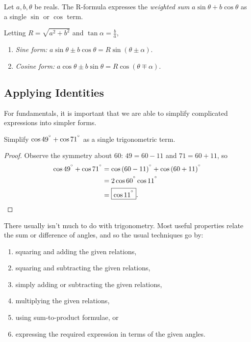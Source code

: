 \documentclass[../main.tex]{subfiles}
\begin{document}
\begin{proposition}
    Let $a,b,\theta$ be reals. The R-formula expresses the \textit{weighted sum} $a\sin\theta+b\cos\theta$ as a single $\sin$ or $\cos$ term.

    Letting $R=\sqrt{a^2+b^2}$ and $\tan\alpha=\frac{b}{a}$,
    \begin{enumerate}
        \item \textit{Sine form:} $a\sin\theta\pm b\cos\theta=R\sin(\theta\pm\alpha).$
        \item \textit{Cosine form:} $a\cos\theta\pm b\sin\theta=R\cos(\theta\mp\alpha).$
    \end{enumerate}
\end{proposition}
\subsection{Applying Identities \ez}
For fundamentals, it is important that we are able to simplify complicated expressions into simpler forms.
\begin{example}
    Simplify $\cos{49^{^\circ}}+\cos{71^{^\circ}}$ as a single trigonometric term.
\end{example}
\begin{proof}
    Observe the symmetry about $60$: $49=60-11$ and $71=60+11$, so
    \begin{align*}
        \cos{49^{^\circ}}+\cos{71^{^\circ}}&=\cos{(60-11)^{^\circ}}+\cos{(60+11)^{^\circ}} \\
        &=2\cos{60^{^\circ}}\cos{11^{^\circ}} \\
        &=\boxed{\cos{11^{^\circ}}}.
    \end{align*}
\end{proof}

\begin{proposition}[Toolkit]
    There usually isn't much to do with trigonometry. Most useful properties relate the sum or difference of angles, and so the usual techniques go by:
    \begin{enumerate}
        \item squaring and adding the given relations,
        \item squaring and subtracting the given relations,
        \item simply adding or subtracting the given relations,
        \item multiplying the given relations, 
        \item using sum-to-product formulae, or
        \item expressing the required expression in terms of the given angles.
    \end{enumerate}
\end{proposition}
\end{document}
